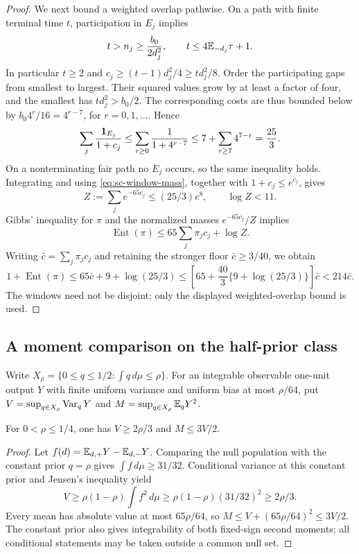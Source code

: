 \begin{proof}
We next bound a weighted overlap pathwise.  On a path with finite terminal
time $t$, participation in $E_j$ implies
\[
 t>n_j\ge\frac{b_0}{2d_j^2},\qquad
 t\le4\mathbb E_{-d_j}\tau+1.
\]
In particular $t\ge2$ and
$c_j\ge(t-1)d_j^2/4\ge td_j^2/8$.
Order the participating gaps from smallest to largest.  Their squared
values grow by at least a factor of four, and the smallest has
$td_j^2>b_0/2$.  The corresponding costs are thus bounded below by
$b_0 4^r/16=4^{r-7}$, for $r=0,1,\ldots$.  Hence
\[
 \sum_j\frac{\mathbf 1_{E_j}}{1+c_j}
 \le\sum_{r\ge0}\frac1{1+4^{r-7}}
 \le7+\sum_{r\ge7}4^{7-r}=\frac{25}{3}.
\]
On a nonterminating fair path no $E_j$ occurs, so the same inequality
holds.  Integrating and using \eqref{eq:sc-window-mass}, together with
$1+c_j\le e^{c_j}$, gives
\[
 Z:=\sum_je^{-65c_j}\le(25/3)e^8,
 \qquad \log Z<11.
\]
Gibbs' inequality for $\pi$ and the normalized masses $e^{-65c_j}/Z$
implies
\[
 \operatorname{Ent}(\pi)\le65\sum_j\pi_jc_j+\log Z.
\]
Writing $\bar c=\sum_j\pi_jc_j$ and retaining the stronger floor
$\bar c\ge3/40$, we obtain
\[
 1+\operatorname{Ent}(\pi)
 \le65\bar c+9+\log(25/3)
 \le\left[65+\frac{40}{3}\{9+\log(25/3)\}\right]\bar c
 <214\bar c.
\]
The windows need not be disjoint; only the displayed weighted-overlap
bound is used.
\end{proof}


\subsection{A moment comparison on the half-prior class}

Write $X_\rho=\{0\le q\le1/2:\int q\,d\mu\le\rho\}$.
For an integrable observable one-unit output $Y$ with finite uniform
variance and uniform bias at most $\rho/64$, put $V=\sup_{q\in X_\rho}\operatorname{Var}_qY$ and
$M=\sup_{q\in X_\rho}\mathbb E_qY^2$.

\begin{lemma}\label{lem:lf-moment}
For $0<\rho\le1/4$, one has $V\ge2\rho/3$ and $M\le3V/2$.
\end{lemma}
\begin{proof}
Let $f(d)=\mathbb E_{d,+}Y-\mathbb E_{d,-}Y$. Comparing the null population with
the constant prior $q=\rho$ gives $\int f\,d\mu\ge31/32$.
Conditional variance at this constant prior and Jensen's inequality yield
\[
 V\ge\rho(1-\rho)\int f^2\,d\mu
 \ge\rho(1-\rho)(31/32)^2\ge2\rho/3.
\]
Every mean has absolute value at most $65\rho/64$, so
$M\le V+(65\rho/64)^2\le3V/2$.
The constant prior also gives integrability of both fixed-sign second
moments; all conditional statements may be taken outside a common null set.
\end{proof}

